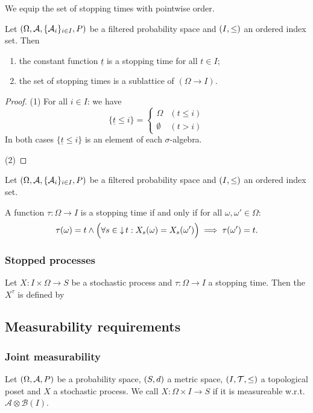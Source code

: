 We equip the set of stopping times with pointwise order.

\begin{lemma}
Let $\left( \Omega, \mathcal{A}, \{\mathcal{A}_i\}_{i\in I}, P \right)$ be a filtered probability space and $\left( I,\leq \right)$ an ordered index set. Then
\begin{enumerate}
\item the constant function $\underline{t}$ is a stopping time for all $t\in I$;
\item the set of stopping times is a sublattice of $(\Omega\to I)$.
\end{enumerate}
\end{lemma}
\begin{proof}
(1) For all $i\in I$: we have
\[ \{\underline{t} \leq i\} = \begin{cases}
\Omega & (t\leq i) \\
\emptyset & (t > i)
\end{cases} \]
In both cases $\{\underline{t} \leq i\}$ is an element of each $\sigma$-algebra.

(2)
\end{proof}

\begin{theorem}
Let $\left( \Omega, \mathcal{A}, \{\mathcal{A}_i\}_{i\in I}, P \right)$ be a filtered probability space and $\left( I,\leq \right)$ an ordered index set.

A function $\tau: \Omega\to I$ is a stopping time \textup{if and only if} for all $\omega,\omega'\in \Omega$:
\[ \tau(\omega) = t \land \Big( \forall s\in\mathop{\downarrow} t: X_s(\omega) = X_s(\omega') \Big) \implies \tau(\omega')=t. \]
\end{theorem}

\subsubsection{Stopped processes}
\begin{definition}
Let $X: I\times \Omega\to S$ be a stochastic process and $\tau:\Omega\to I$ a stopping time. Then the  $X^\tau$ is defined by
\end{definition}

\subsection{Measurability requirements}
\subsubsection{Joint measurability}
\begin{definition}
Let $\left( \Omega, \mathcal{A}, P \right)$ be a probability space, $\left( S,d \right)$ a metric space, $\left( I,\mathcal{T}, \leq \right)$ a topological poset and $X$ a stochastic process. We call $X: \Omega\times I\to S$  if it is measureable w.r.t. $\mathcal{A}\otimes \mathcal{B}(I)$.
\end{definition}

